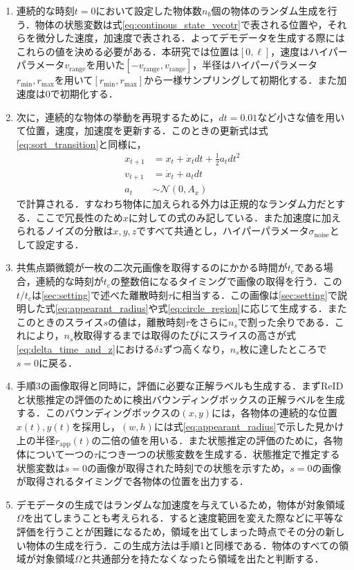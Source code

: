 \begin{enumerate}[label=手順\arabic*]
    \item 連続的な時刻$t=0$において設定した物体数$n_b$個の物体のランダム生成を行う．物体の状態変数は式\ref{eq:continous_state_vecotr}で表される位置や，それらを微分した速度，加速度で表される．よってデモデータを生成する際にはこれらの値を決める必要がある．本研究では位置は$[0, \ell]$，速度はハイパーパラメータ$v_{\text{range}}$を用いた$[-v_{\text{range}}, v_{\text{range}}]$，半径はハイパーパラメータ$r_{\text{min}}, r_{\text{max}}$を用いて$[r_{\text{min}}, r_{\text{max}}]$から一様サンプリングして初期化する．また加速度は$0$で初期化する．
    \item 次に，連続的な物体の挙動を再現するために，$dt=0.01$など小さな値を用いて位置，速度，加速度を更新する．このときの更新式は式\ref{eq:sort_transition}と同様に，
    \begin{equation}
        \label{eq:transition}
        \begin{aligned}
            x_{t+1} &= x_t + \dot{x}_t dt + \frac{1}{2} a_t dt^2
            \\v_{t+1} &= \dot{x}_t + a_t dt
            \\a_t &\sim \mathcal{N}(0, A_x)
        \end{aligned}
    \end{equation}
    で計算される．すなわち物体に加えられる外力は正規的なランダム力だとする．ここで冗長性のため$x$に対しての式のみ記している．また加速度に加えられるノイズの分散は$x, y, z$ですべて共通とし，ハイパーパラメータ$\sigma_{\text{noise}}$として設定する．
    \item 共焦点顕微鏡が一枚の二次元画像を取得するのにかかる時間が$t_c$である場合，連続的な時刻が$t_c$の整数倍になるタイミングで画像の取得を行う．この$t / t_c$は\ref{sec:setting}で述べた離散時刻$\tau$に相当する．この画像は\ref{sec:setting}で説明した式\ref{eq:appearant_radius}や式\ref{eq:circle_region}に応じて生成する．またこのときのスライス$s$の値は，離散時刻$\tau$をさらに$n_s$で割った余りである．これにより，$n_s$枚取得するまでは取得のたびにスライスの高さが式\ref{eq:delta_time_and_z}における$\delta z$ずつ高くなり，$n_s$枚に達したところで$s = 0$に戻る．
    \item 手順3の画像取得と同時に，評価に必要な正解ラベルも生成する．まずReIDと状態推定の評価のために検出バウンディングボックスの正解ラベルを生成する．このバウンディングボックスの$(x, y)$には，各物体の連続的な位置$x(t), y(t)$を採用し，$(w, h)$には式\ref{eq:appearant_radius}で示した見かけ上の半径$r_{\text{app}}(t)$の二倍の値を用いる．また状態推定の評価のために，各物体について一つの$\tau$につき一つの状態変数を生成する．状態推定で推定する状態変数は$s = 0$の画像が取得された時刻での状態を示すため，$s = 0$の画像が取得されるタイミングで各物体の位置を出力する．
    \item デモデータの生成ではランダムな加速度を与えているため，物体が対象領域$\Omega$を出てしまうことも考えられる．すると速度範囲を変えた際などに平等な評価を行うことが困難になるため，領域を出てしまった時点でその分の新しい物体の生成を行う．この生成方法は手順1と同様である．物体のすべての領域が対象領域$\Omega$と共通部分を持たなくなったら領域を出たと判断する．
\end{enumerate}

